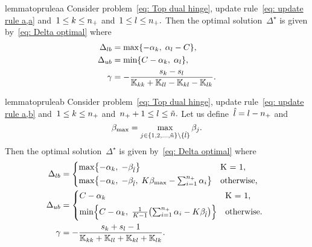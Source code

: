 \begin{restatable}{lemma}{topruleaa}\label{thm: toppushk family hinge update a,a}
  Consider problem~\eqref{eq: Top dual hinge}, update rule~\eqref{eq: update rule a,a} and~$1 \leq k \leq n_{+}$ and~$1 \leq l \leq n_{+}.$ Then the optimal solution~$\Delta^{\star}$ is given by~\eqref{eq: Delta optimal} where
  \begin{align*}
    \Delta_{lb} & = \max\{- \alpha_k,\; \alpha_l - C\}, \\
    \Delta_{ub} & = \min\{C - \alpha_k,\; \alpha_l \}, \\
    \gamma & = -\frac{s_k - s_l}{\mathbb{K}_{kk} + \mathbb{K}_{ll} - \mathbb{K}_{kl} - \mathbb{K}_{lk}}.
  \end{align*}
\end{restatable}

\begin{restatable}{lemma}{topruleab}\label{thm: toppushk family hinge update a,b}
  Consider problem~\eqref{eq: Top dual hinge}, update rule~\eqref{eq: update rule a,b} and~$1 \leq k \leq n_{+}$ and~$n_{+} + 1 \leq l \leq \tilde{n}.$ Let us define~$\hat{l} = l - n_{+}$ and
  \begin{equation*}
    \beta_{\max} = \max_{j \in \{1, 2, \ldots, \tilde{n} \} \setminus \{\hat{l}\}} \beta_j.
  \end{equation*}
  Then the optimal solution~$\Delta^{\star}$ is given by~\eqref{eq: Delta optimal} where
  \begin{align*}
    \Delta_{lb} & = 
      \begin{cases*}
        \max \Brac[c]{- \alphak, \;  -\betal} & K = 1, \\
        \max \Brac[c]{- \alphak, \;  -\betal, \; K\beta_{\max} - \sum_{i = 1}^{\npos} \alpha_i} & \textrm{otherwise},
      \end{cases*} \\
    \Delta_{ub} & = 
      \begin{cases*}
          C - \alphak & K = 1, \\
          \min \Brac[c]{C - \alphak, \; \frac{1}{K-1}\Brac{\sum_{i = 1}^{\npos} \alpha_i - K \betal}}  & \textrm{otherwise}.
      \end{cases*} \\
    \gamma & = - \frac{s_k + s_l - 1}{\K_{kk} + \K_{ll} + \K_{kl} + \K_{lk}}.
  \end{align*}
\end{restatable}

